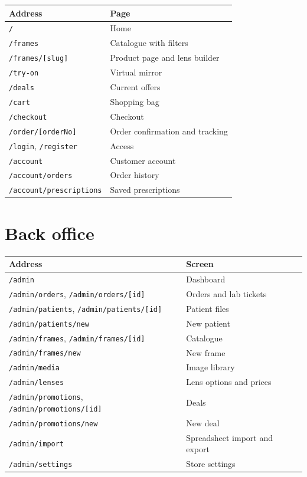 \documentclass[11pt,a4paper]{report}
\newcommand{\code}[1]{\texttt{\small #1}}
\begin{document}
\begin{center}
\begin{tabular}{@{}ll@{}}
\toprule
\textbf{Address} & \textbf{Page}\\
\midrule
\code{/} & Home\\
\code{/frames} & Catalogue with filters\\
\code{/frames/[slug]} & Product page and lens builder\\
\code{/try-on} & Virtual mirror\\
\code{/deals} & Current offers\\
\code{/cart} & Shopping bag\\
\code{/checkout} & Checkout\\
\code{/order/[orderNo]} & Order confirmation and tracking\\
\code{/login}, \code{/register} & Access\\
\code{/account} & Customer account\\
\code{/account/orders} & Order history\\
\code{/account/prescriptions} & Saved prescriptions\\
\bottomrule
\end{tabular}
\end{center}

\section{Back office}

\begin{center}
\begin{tabular}{@{}ll@{}}
\toprule
\textbf{Address} & \textbf{Screen}\\
\midrule
\code{/admin} & Dashboard\\
\code{/admin/orders}, \code{/admin/orders/[id]} & Orders and lab tickets\\
\code{/admin/patients}, \code{/admin/patients/[id]} & Patient files\\
\code{/admin/patients/new} & New patient\\
\code{/admin/frames}, \code{/admin/frames/[id]} & Catalogue\\
\code{/admin/frames/new} & New frame\\
\code{/admin/media} & Image library\\
\code{/admin/lenses} & Lens options and prices\\
\code{/admin/promotions}, \code{/admin/promotions/[id]} & Deals\\
\code{/admin/promotions/new} & New deal\\
\code{/admin/import} & Spreadsheet import and export\\
\code{/admin/settings} & Store settings\\
\bottomrule
\end{tabular}
\end{center}
\end{document}

